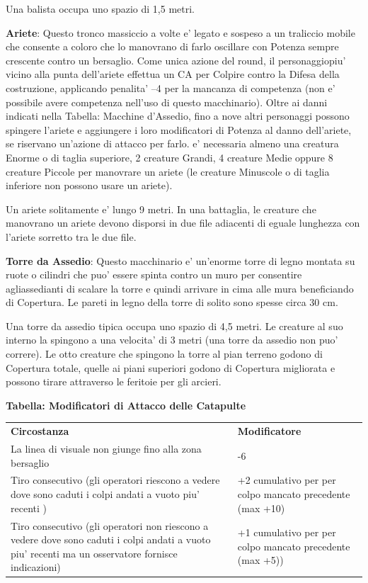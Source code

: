 \documentclass[a4paper,11pt,twoside,openany]{book}
\begin{document}
{		Una balista occupa uno spazio di 1,5 metri.
		
		\textbf{Ariete}: Questo tronco massiccio a volte e' legato e sospeso a un traliccio mobile che consente a coloro che lo manovrano di farlo oscillare con Potenza sempre crescente contro un bersaglio. Come unica azione del round, il personaggiopiu' vicino alla punta dell'ariete effettua un CA per Colpire contro la Difesa della costruzione, applicando penalita' --4 per la mancanza di competenza (non e' possibile avere competenza nell'uso di questo macchinario). Oltre ai danni indicati nella Tabella: Macchine d'Assedio, fino a nove altri personaggi possono spingere l'ariete e aggiungere i loro modificatori di Potenza al danno dell'ariete, se riservano un'azione di attacco per farlo. e' necessaria almeno una creatura Enorme o di taglia superiore, 2 creature Grandi, 4 creature Medie oppure 8 creature Piccole per manovrare un ariete (le creature Minuscole o di taglia inferiore non possono usare un ariete).
		
		Un ariete solitamente e' lungo 9 metri. In una battaglia, le creature che manovrano un ariete devono disporsi in due file adiacenti di eguale lunghezza con l'ariete sorretto tra le due file. 
		
		\textbf{Torre da Assedio}: Questo macchinario e' un'enorme torre di legno montata su ruote o cilindri che puo' essere spinta contro un muro per consentire agliassedianti di scalare la torre e quindi arrivare in cima alle mura beneficiando di Copertura. Le pareti in legno della torre di solito sono spesse circa 30 cm.
		
		Una torre da assedio tipica occupa uno spazio di 4,5 metri. Le creature al suo interno la spingono a una velocita' di 3 metri (una torre da assedio non puo' correre). Le otto creature che spingono la torre al pian terreno godono di Copertura totale, quelle ai piani superiori godono di Copertura migliorata e possono tirare attraverso le feritoie per gli arcieri.
		
		\bigskip
		
		\textbf{Tabella: Modificatori di Attacco delle Catapulte}
		
		\begin{tabular}{L{10cm} L{6cm}} 
			\toprule
			\textbf{Circostanza} & \textbf{Modificatore}\tabularnewline
			La linea di visuale non giunge fino alla zona bersaglio & -6\tabularnewline
			Tiro consecutivo (gli operatori riescono a vedere dove sono caduti i colpi andati a vuoto piu' recenti ) &+2 cumulativo per per colpo  mancato precedente (max +10)\tabularnewline
			Tiro consecutivo (gli operatori non riescono a vedere dove sono caduti i colpi andati a vuoto piu' recenti ma un osservatore fornisce indicazioni) & +1 cumulativo per per colpo mancato precedente (max +5))\tabularnewline
		\end{tabular}
		
}
\end{document}
